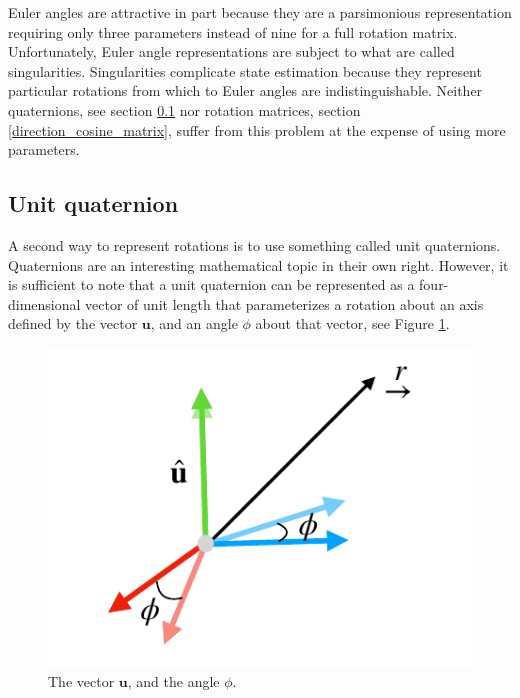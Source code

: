 Euler angles are attractive in part because they are
a parsimonious representation requiring only three parameters instead
of nine for a full rotation matrix. Unfortunately,
Euler angle representations are subject to what are
called singularities. Singularities complicate
state estimation because they represent particular rotations from which to
Euler angles are indistinguishable. Neither quaternions, see section \ref{unit_quaternion} nor
rotation matrices, section \ref{direction_cosine_matrix}, suffer from this problem at the expense
of using more parameters.

\subsection{Unit quaternion}
\label{unit_quaternion}

A second way to represent rotations is to use something called unit quaternions. Quaternions are an interesting
mathematical topic in their own right. However, it is sufficient to note that a unit quaternion can be represented as
a four-dimensional vector of unit length that parameterizes a rotation about an axis
defined by the vector $\mathbf{u}$, and an angle $\phi$ about that vector, see Figure \ref{coordinate_rotations_3}. 

\begin{figure}[!htb]
\begin{center}
\includegraphics[scale=0.290]{img/coordinate_transforms/coordinate_rotations_3.jpeg}
\end{center}
\caption{The vector $\mathbf{u}$, and the angle $\phi$.}
\label{coordinate_rotations_3}
\end{figure}

